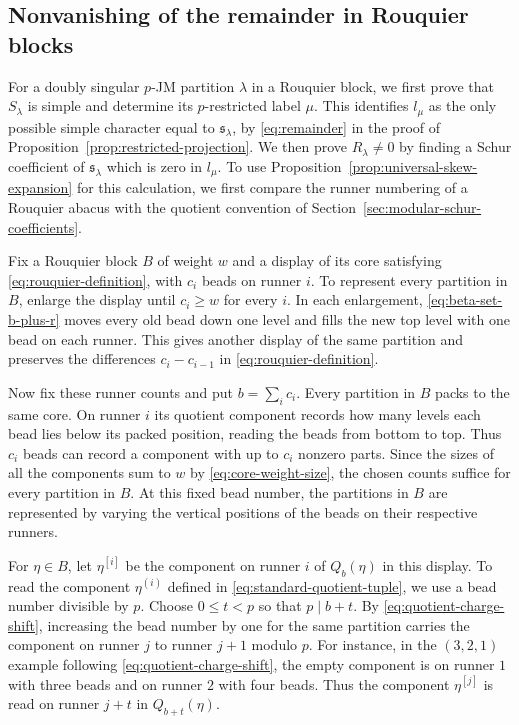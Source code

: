 \documentclass[12pt,reqno,a4paper]{amsart}
\numberwithin{equation}{section}
\numberwithin{figure}{section}
\theoremstyle{plain}
\theoremstyle{definition}
\begin{document}
\subsection{Nonvanishing of the remainder in Rouquier blocks}
\label{subsec:rouquier-nonvanishing}

For a doubly singular $p$-JM partition $\lambda$ in a Rouquier
block, we first prove that $S_\lambda$ is simple and determine its
$p$-restricted label $\mu$.  This identifies $l_\mu$ as the only
possible simple character equal to $\mathfrak{s}_\lambda$, by
\eqref{eq:remainder} in the proof of
Proposition~\ref{prop:restricted-projection}.  We then prove
$R_\lambda\neq0$ by finding a Schur coefficient of
$\mathfrak{s}_\lambda$ which is zero in $l_\mu$.
To use Proposition~\ref{prop:universal-skew-expansion} for this
calculation, we first compare the runner numbering of a Rouquier
abacus with the quotient convention of
Section~\ref{sec:modular-schur-coefficients}.

Fix a Rouquier block $B$ of weight $w$ and a display of its core
satisfying \eqref{eq:rouquier-definition}, with $c_i$ beads on runner $i$.
To represent every partition in $B$, enlarge the display until $c_i\geq w$
for every $i$.  In each enlargement, \eqref{eq:beta-set-b-plus-r}
moves every old bead down one level and fills the new top level with
one bead on each runner.  This gives another display of the same
partition and preserves the differences $c_i-c_{i-1}$ in
\eqref{eq:rouquier-definition}.

Now fix these runner counts and put $b=\sum_i c_i$.
Every partition in $B$ packs to the same core.  On runner $i$ its
quotient component records how many levels each bead lies below its
packed position, reading the beads from bottom to top.  Thus $c_i$
beads can record a component with up to $c_i$ nonzero parts.
Since the sizes of all the components sum to $w$ by
\eqref{eq:core-weight-size}, the chosen counts suffice for every
partition in $B$.  At this fixed bead number, the partitions in $B$
are represented by varying the vertical positions of the beads on
their respective runners.

For $\eta\in B$, let $\eta^{[i]}$ be the component on runner $i$
of $Q_b(\eta)$ in this display.  To read the component
$\eta^{(i)}$ defined in \eqref{eq:standard-quotient-tuple}, we use
a bead number divisible by $p$.  Choose $0\leq t<p$ so that $p\mid b+t$.
By \eqref{eq:quotient-charge-shift}, increasing the bead number by one
for the same partition carries the component on runner $j$ to runner
$j+1$ modulo $p$.  For instance, in the $(3,2,1)$ example following
\eqref{eq:quotient-charge-shift}, the empty component is on runner $1$
with three beads and on runner $2$ with four beads.
Thus the component $\eta^{[j]}$ is read on runner $j+t$ in $Q_{b+t}(\eta)$.
\end{document}
